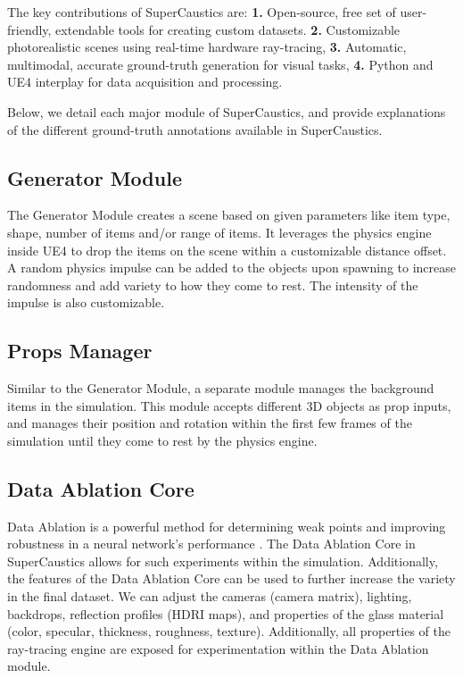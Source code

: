 \documentclass[conference]{IEEEtran}
\begin{document}
The key contributions of SuperCaustics are: \textbf{1.} Open-source, free set of user-friendly, extendable tools for creating custom datasets.
\textbf{2.} Customizable photorealistic scenes using real-time hardware ray-tracing,
\textbf{3.} Automatic, multimodal, accurate ground-truth generation for visual tasks,
\textbf{4.} Python and UE4 interplay for data acquisition and processing.

Below, we detail each major module of SuperCaustics, and provide explanations of the different ground-truth annotations available in SuperCaustics.



\subsection{Generator Module}\label{Generator}
The Generator Module creates a scene based on given parameters like item type, shape, number of items and/or range of items. It leverages the physics engine inside UE4 to drop the items on the scene within a customizable distance offset. A random physics impulse can be added to the objects upon spawning to increase randomness and add variety to how they come to rest. The intensity of the impulse is also customizable.



\subsection{Props Manager}\label{Props}
Similar to the Generator Module, a separate module manages the background items in the simulation. This module accepts different 3D objects as prop inputs, and manages their position and rotation within the first few frames of the simulation until they come to rest by the physics engine. 


\subsection{Data Ablation Core}\label{DataAblation} Data Ablation is a powerful method for determining weak points and improving robustness in a neural network's performance \cite{AIP}. The Data Ablation Core in SuperCaustics allows for such experiments within the simulation. Additionally, the features of the Data Ablation Core can be used to further increase the variety in the final dataset. We can adjust the cameras (camera matrix), lighting, backdrops, reflection profiles (HDRI maps), and properties of the glass material (color, specular, thickness, roughness, texture). Additionally, all properties of the ray-tracing engine are exposed for experimentation within the Data Ablation module.
\end{document}
